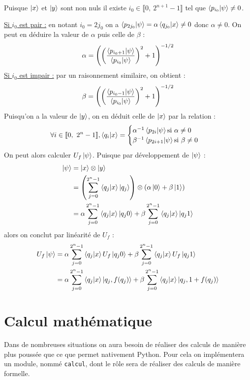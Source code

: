 \documentclass[french]{article}
\newcommand{\p}{\texttt} %
\newcommand{\somme}{\displaystyle\sum}
\newcommand{\entiers}[2]{\llbracket #1,\ #2\rrbracket} %
\begin{document}
Puisque $\ket x$ et $\ket y$ sont non nuls il existe $i_0 \in \entiers{0}{2^{n+1}-1}$ tel que $\bra{p_{i_0}} \ket{\psi} \not= 0$.


\noindent \underline{Si $i_0$ est pair :} en notant $i_0 = 2 j_0$ on a $\bra{p_{2 j_0}} \ket{\psi} = \alpha \bra{q_{j_0}} \ket{x} \not= 0$ donc $\alpha \not= 0$. On peut en déduire la valeur de $\alpha$ puis celle de $\beta$ :
$$\alpha = {\left(
{\left(\frac
    {\bra{p_{i_0+1}} \ket{\psi}}
    {\bra{p_{i_0}} \ket{\psi}
}\right)}^2
+ 1
\right)}^{-1/2}$$
\underline{Si $i_0$ est impair :} par un raisonnement similaire, on obtient :
$$\beta = {\left(
{\left(\frac
    {\bra{p_{i_0-1}} \ket{\psi}}
    {\bra{p_{i_0}} \ket{\psi}
}\right)}^2
+ 1
\right)}^{-1/2}$$
Puisqu'on a la valeur de $\ket y$, on en déduit celle de $\ket x$ par la relation :
$$\forall i \in \entiers{0}{2^n - 1},
\bra{q_i} \ket{x} = \begin{cases}
\alpha^{-1} \bra{p_{2i}} \ket{\psi} \text{si } \alpha \not= 0 \\
\beta^{-1} \bra{p_{2i+1}} \ket{\psi} \text{si } \beta \not= 0 \\
\end{cases}$$
On peut alors calculer $U_f \ket \psi$. Puisque par développement de $\ket \psi$ :
\begin{align*}
\ket \psi &= \ket x \otimes \ket y \\
&= \left( \somme^{2^n-1}_{j=0} \bra{q_j}\ket{x}\ket{q_j} \right) \otimes (\alpha \ket 0 + \beta \ket 1) \\
&= \alpha \somme^{2^n-1}_{j=0} \bra{q_j}\ket{x}\ket{q_j0}
+ \beta \somme^{2^n-1}_{j=0} \bra{q_j}\ket{x}\ket{q_j1}
\end{align*}
alors on conclut par linéarité de $U_f$ :
\begin{align*}
U_f \ket \psi
&= \alpha \somme^{2^n-1}_{j=0} \bra{q_j} \ket{x} U_f \ket{q_j0}
+ \beta \somme^{2^n-1}_{j=0} \bra{q_j} \ket{x} U_f \ket{q_j1} \\
&= \alpha \somme^{2^n-1}_{j=0} \bra{q_j} \ket{x} \ket{q_j, f(q_j)}
+ \beta \somme^{2^n-1}_{j=0} \bra{q_j} \ket{x} \ket{q_j, 1 + f(q_j)} \\
\end{align*}

\section{Calcul mathématique}


Dans de nombreuses situations on aura besoin de réaliser des calculs de manière plus poussée que ce que permet nativement Python. Pour cela on implémentera un module, nommé \p{calcul}, dont le rôle sera de réaliser des calculs de manière formelle.
\end{document}

